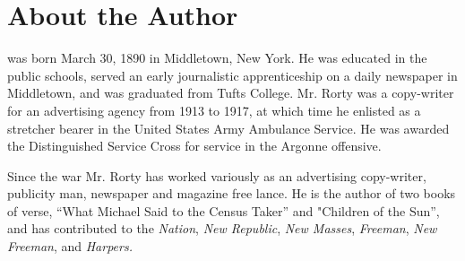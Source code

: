 \documentclass[openany,nobib]{tufte-book}
\let\oldchapter\chapter
\def\chapter{%
  \setcounter{footnote}{0}%
  \oldchapter
}
\newcounter{oldtocdepth}
\newcommand{\hidefromtoc}{%
  \setcounter{oldtocdepth}{\value{tocdepth}}%
  \addtocontents{toc}{\protect\setcounter{tocdepth}{-10}}%
}
\newcommand{\unhidefromtoc}{%
  \addtocontents{toc}{\protect\setcounter{tocdepth}{\value{oldtocdepth}}}%
}
\begin{document}
\begin{fullwidth}
\newpage
\thispagestyle{empty}

\begin{adjustwidth}{0pt}{0pt}

\par{}

\end{adjustwidth}

\end{fullwidth}

\thispagestyle{empty}
\begingroup
\setlength{\parindent}{0cm}\setlength{\parskip}{2ex plus 0.3ex minus 0.1ex}
\hidefromtoc
\chapter{About the Author}
\unhidefromtoc


 was born March 30, 1890 in Middletown, New York. He was
educated in the public schools, served an early journalistic
apprenticeship on a daily newspaper in Middletown, and was graduated
from Tufts College. Mr. Rorty was a copy-writer for an advertising
agency from 1913 to 1917, at which time he enlisted as a stretcher
bearer in the United States Army Ambulance Service. He was awarded the
Distinguished Service Cross for service in the Argonne offensive.

Since the war Mr. Rorty has worked variously as an advertising
copy-writer, publicity man, newspaper and magazine free lance. He is the
author of two books of verse, ``What Michael Said to the Census Taker''
and "Children of the Sun'', and has contributed to the \emph{Nation},
\emph{New Republic}, \emph{New Masses}, \emph{Freeman}, \emph{New
Freeman}, and \emph{Harpers.}

\endgroup


\begin{fullwidth}

\tableofcontents

\end{fullwidth}
\end{document}
